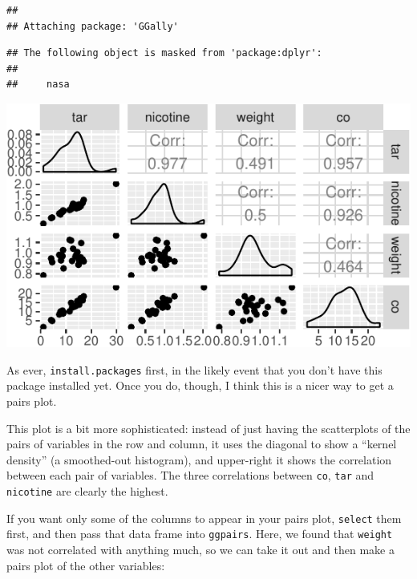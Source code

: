 \documentclass[]{tufte-book}
\newenvironment{Shaded}{}{}
\newcommand{\KeywordTok}[1]{\textcolor[rgb]{0.00,0.44,0.13}{\textbf{#1}}}
\newcommand{\NormalTok}[1]{#1}
\newcommand{\OperatorTok}[1]{\textcolor[rgb]{0.40,0.40,0.40}{#1}}
\newcommand{\StringTok}[1]{\textcolor[rgb]{0.25,0.44,0.63}{#1}}
\theoremstyle{definition}
\theoremstyle{definition}
\theoremstyle{definition}
\theoremstyle{remark}
\begin{document}
\begin{verbatim}
## 
## Attaching package: 'GGally'
\end{verbatim}

\begin{verbatim}
## The following object is masked from 'package:dplyr':
## 
##     nasa
\end{verbatim}

\begin{Shaded}
\end{Shaded}

\includegraphics{12-regression_files/figure-latex/unnamed-chunk-24-1}

As ever, \texttt{install.packages} first, in the likely event that you
don't have this package installed yet. Once you do, though, I think this
is a nicer way to get a pairs plot.

This plot is a bit more sophisticated: instead of just having the
scatterplots of the pairs of variables in the row and column, it uses
the diagonal to show a ``kernel density'' (a smoothed-out histogram),
and upper-right it shows the correlation between each pair of variables.
The three correlations between \texttt{co}, \texttt{tar} and
\texttt{nicotine} are clearly the highest.

If you want only some of the columns to appear in your pairs plot,
\texttt{select} them first, and then pass that data frame into
\texttt{ggpairs}. Here, we found that \texttt{weight} was not correlated
with anything much, so we can take it out and then make a pairs plot of
the other variables:
\end{document}
